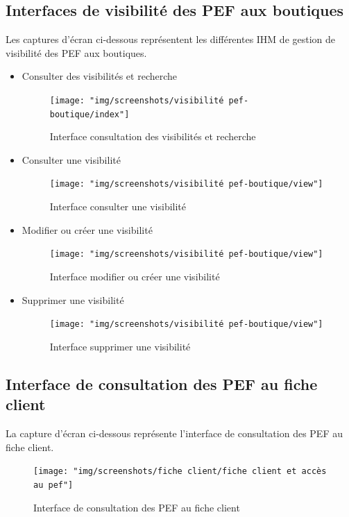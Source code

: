 \subsection{Interfaces de visibilité des PEF aux boutiques}
Les captures d'écran ci-dessous représentent les différentes IHM de gestion de visibilité des PEF aux boutiques.
\begin{itemize}
	\item Consulter des visibilités et recherche
	\begin{figure}[H]
		\centering
		\texttt{[image: "img/screenshots/visibilité pef-boutique/index"]}
		\caption[Interface consultation des visibilités et recherche]{Interface consultation des visibilités et recherche}
		\label{fig:index-visib}
	\end{figure}
	
	\item Consulter une visibilité 
	\begin{figure}[H]
		\centering
		\texttt{[image: "img/screenshots/visibilité pef-boutique/view"]}
		\caption[Interface voir une visibilité]{Interface consulter une visibilité }
		\label{fig:view-visib}
	\end{figure}

	\item Modifier ou créer une visibilité 
	\begin{figure}[H]
		\centering
		\texttt{[image: "img/screenshots/visibilité pef-boutique/view"]}
		\caption[Interface modifier ou créer une visibilité]{Interface modifier ou créer une visibilité}
		\label{fig:edit-visib}
	\end{figure}

	\item Supprimer une visibilité 
	\begin{figure}[H]
		\centering
		\texttt{[image: "img/screenshots/visibilité pef-boutique/view"]}
		\caption[Interface supprimer une visibilité]{Interface supprimer une visibilité}
		\label{fig:delete-visib}
	\end{figure}
	
\end{itemize}
\subsection{Interface de consultation des PEF au fiche client}
La capture d'écran ci-dessous représente l’interface de consultation des PEF au fiche client.
\begin{figure}[H]
	\centering
	\texttt{[image: "img/screenshots/fiche client/fiche client et accès au pef"]}
	\caption[Interface de consultation des PEF au fiche client]{Interface de consultation des PEF au fiche client}
	\label{fig:fiche-client-et-acces-au-pef}
\end{figure}


